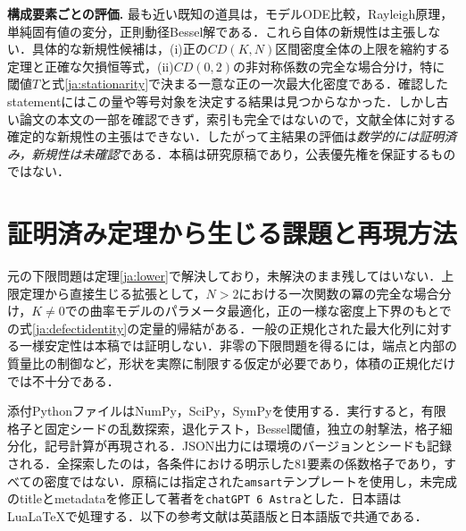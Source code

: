 \documentclass[12pt]{amsart}
\theoremstyle{definition}
\theoremstyle{remark}
\numberwithin{equation}{section}
\begin{document}
\noindent\textbf{構成要素ごとの評価.}
最も近い既知の道具は，モデルODE比較，Rayleigh原理，単純固有値の変分，正則動径Bessel解である．これら自体の新規性は主張しない．具体的な新規性候補は，(i)正の$CD(K,N)$区間密度全体の上限を縮約する定理と正確な欠損恒等式，(ii)$CD(0,2)$の非対称係数の完全な場合分け，特に閾値$T$と式\eqref{ja:stationarity}で決まる一意な正の一次最大化密度である．確認したstatementにはこの量や等号対象を決定する結果は見つからなかった．しかし古い論文の本文の一部を確認できず，索引も完全ではないので，文献全体に対する確定的な新規性の主張はできない．したがって主結果の評価は\emph{数学的には証明済み，新規性は未確認}である．本稿は研究原稿であり，公表優先権を保証するものではない．

\section{証明済み定理から生じる課題と再現方法}
元の下限問題は定理\ref{ja:lower}で解決しており，未解決のまま残してはいない．上限定理から直接生じる拡張として，$N>2$における一次関数の冪の完全な場合分け，$K\ne0$での曲率モデルのパラメータ最適化，正の一様な密度上下界のもとでの式\eqref{ja:defectidentity}の定量的帰結がある．一般の正規化された最大化列に対する一様安定性は本稿では証明しない．非零の下限問題を得るには，端点と内部の質量比の制御など，形状を実際に制限する仮定が必要であり，体積の正規化だけでは不十分である．

添付PythonファイルはNumPy，SciPy，SymPyを使用する．実行すると，有限格子と固定シードの乱数探索，退化テスト，Bessel閾値，独立の射撃法，格子細分化，記号計算が再現される．JSON出力には環境のバージョンとシードも記録される．全探索したのは，各条件における明示した81要素の係数格子であり，すべての密度ではない．原稿には指定された\texttt{amsart}テンプレートを使用し，未完成のtitleとmetadataを修正して著者を\texttt{chatGPT 6 Astra}とした．日本語はLuaLaTeXで処理する．以下の参考文献は英語版と日本語版で共通である．
\end{document}
